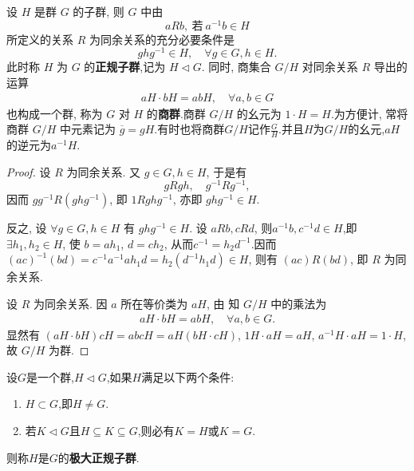\documentclass[../../main.tex]{subfiles}%
\begin{document}
\begin{theorem}\label{theorem:抽象代数-定理 1.3.4}
设 \( H \) 是群 \( G \) 的子群, 则 \( G \) 中由
\[
a R b, \ \text{若} \ a^{-1}b \in H
\]
所定义的关系 \( R \) 为同余关系的充分必要条件是
\[
g h g^{-1} \in H, \quad \forall g \in G, h \in H.
\]
此时称 \( H \) 为 \( G \) 的\textbf{正规子群},记为 \( H \lhd  G \). 
同时, 商集合 \( G/H \) 对同余关系 \( R \) 导出的运算
\begin{align*}
aH \cdot bH = abH, \quad \forall a, b \in G
\end{align*}
也构成一个群, 称为 \( G \) 对 \( H \) 的\textbf{商群}.商群 \( G/H \) 的幺元为 \( 1 \cdot H = H \).为方便计, 常将商群 \( G/H \) 中元素记为 \( \overline{g} = gH \).有时也将商群$G/H$记作$\frac{G}{H}$.并且$H$为$G/H$的幺元,$aH$的逆元为$a^{-1}H$.
\end{theorem}
\begin{proof}

设 \( R \) 为同余关系. 又 \( g \in G, h \in H \), 于是有
\[
gRgh, \quad g^{-1}Rg^{-1},
\]
因而 \( gg^{-1}R(ghg^{-1}) \), 即 \( 1  R  ghg^{-1} \), 亦即 \( ghg^{-1} \in H \).

反之, 设 \( \forall g \in G, h \in H \) 有 \( ghg^{-1} \in H \). 设 \( a R b, c R d \), 则$a^{-1}b,c^{-1}d\in H$,即 \( \exists h_1, h_2 \in H \), 使 \( b = a h_1 \), \( d = c h_2 \), 从而$c^{-1}=h_2d^{-1}$.因而
\( (ac)^{-1}(bd)=c^{-1}a^{-1}ah_1d=h_2\left( d^{-1}h_1d \right) \in H\), 则有 \( (ac)  R  (bd) \), 即 \( R \) 为同余关系.

设 \( R \) 为同余关系. 因 \( a \) 所在等价类为 \( aH \), 由 知 \( G/H \) 中的乘法为
\begin{align}
aH \cdot bH = abH, \quad \forall a, b \in G. \label{eq:1.3.3}
\end{align}
显然有 \( (aH \cdot bH)cH = abcH = aH(bH \cdot cH) \), \( 1H \cdot aH = aH \), \( a^{-1}H \cdot aH = 1 \cdot H \), 故 \( G/H \) 为群.

\end{proof}

\begin{definition}[极大正规子群]
设$G$是一个群,$H\lhd G$,如果$H$满足以下两个条件:
\begin{enumerate}[(1)]
\item $H\subset G$,即$H\neq G$.

\item 若$K\lhd G$且$H\subseteq K\subseteq G$,则必有$K=H$或$K=G$.
\end{enumerate}
则称$H$是$G$的\textbf{极大正规子群}.
\end{definition}
\end{document}
